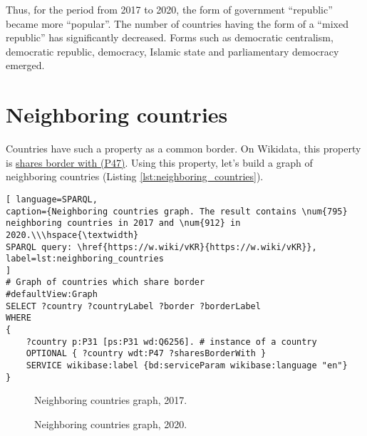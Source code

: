 Thus, for the period from 2017 to 2020, the form of government ``republic'' became more ``popular''. The number of countries having the form of a ``mixed republic'' has significantly decreased. Forms such as democratic centralism, democratic republic, democracy, Islamic state and parliamentary democracy emerged.

\section{Neighboring countries}

Countries have such a property as a common border. On Wikidata, this property is \href{https://www.wikidata.org/wiki/Property:P47}{shares border with (P47)}. Using this property, let's build a graph of neighboring countries (Listing \ref{lst:neighboring_countries}).


\begin{lstlisting}[ language=SPARQL, 
caption={Neighboring countries graph. The result contains \num{795} neighboring countries in 2017 and \num{912} in 2020.\\\hspace{\textwidth}
SPARQL query: \href{https://w.wiki/vKR}{https://w.wiki/vKR}},
label=lst:neighboring_countries
]
# Graph of countries which share border
#defaultView:Graph
SELECT ?country ?countryLabel ?border ?borderLabel
WHERE
{
	?country p:P31 [ps:P31 wd:Q6256]. # instance of a country
	OPTIONAL { ?country wdt:P47 ?sharesBorderWith }
	SERVICE wikibase:label {bd:serviceParam wikibase:language "en"}
}
\end{lstlisting}


\begin{figure*}
	{
		\setlength{\fboxsep}{0pt}%
		\setlength{\fboxrule}{1pt}%
	}
	\caption{Neighboring countries graph, 2017.
	}%
	\label{fig:neighboring_countries_2017}%
\end{figure*}

\begin{figure*}
	{
		\setlength{\fboxsep}{0pt}%
		\setlength{\fboxrule}{1pt}%
	}
	\caption{Neighboring countries graph, 2020.
	}%
	\label{fig:neighboring_countries_2020}%
\end{figure*}


